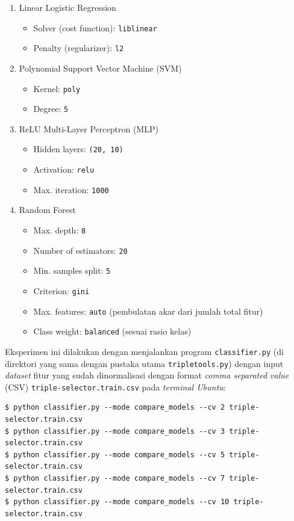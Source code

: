 \begin{enumerate}

	\item Linear Logistic Regression
	\begin{itemize}
		\item Solver (cost function): \verb|liblinear|
		\item Penalty (regularizer): \verb|l2|
	\end{itemize}

	\item Polynomial Support Vector Machine (SVM)
	\begin{itemize}
		\item Kernel: \verb|poly|
		\item Degree: \verb|5|
	\end{itemize}

	\item ReLU Multi-Layer Perceptron (MLP)
	\begin{itemize}
		\item Hidden layers: \verb|(20, 10)|
		\item Activation: \verb|relu| \citep{nair2010rectified}
		\item Max. iteration: \verb|1000|
	\end{itemize}
	
	\item Random Forest
	\begin{itemize}
		\item Max. depth: \verb|8|
		\item Number of estimators: \verb|20|
		\item Min. samples split: \verb|5|
		\item Criterion: \verb|gini| \citep{mingers1989empirical}
		\item Max. features: \verb|auto| (pembulatan akar dari jumlah total fitur)
		\item Class weight: \verb|balanced| (sesuai rasio kelas)
	\end{itemize}

\end{enumerate}

Eksperimen ini dilakukan dengan menjalankan program \verb|classifier.py| (di direktori yang sama dengan pustaka utama \verb|tripletools.py|) dengan input \textit{dataset} fitur yang sudah dinormalisasi dengan format \textit{comma separated value} (CSV) \verb|triple-selector.train.csv| pada \textit{terminal Ubuntu}:

{\scriptsize
\begin{verbatim}
$ python classifier.py --mode compare_models --cv 2 triple-selector.train.csv
$ python classifier.py --mode compare_models --cv 3 triple-selector.train.csv
$ python classifier.py --mode compare_models --cv 5 triple-selector.train.csv
$ python classifier.py --mode compare_models --cv 7 triple-selector.train.csv
$ python classifier.py --mode compare_models --cv 10 triple-selector.train.csv
\end{verbatim}
}

